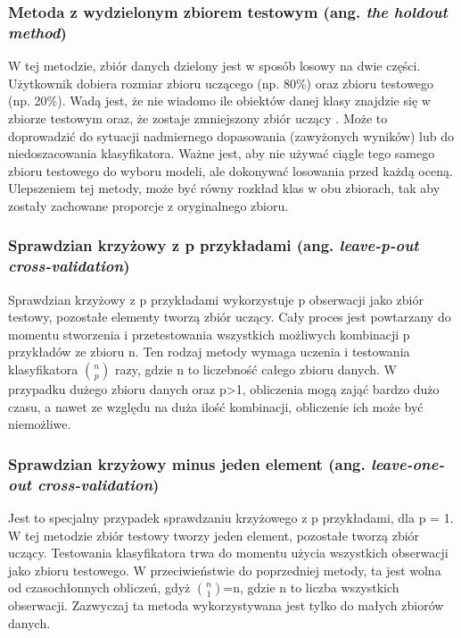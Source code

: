 \subsubsection{Metoda z wydzielonym zbiorem testowym (ang. \textit{the holdout method})}
W tej metodzie, zbiór danych dzielony jest w sposób losowy na dwie części. Użytkownik dobiera rozmiar zbioru uczącego (np. 80\%) oraz zbioru testowego (np. 20\%). Wadą jest, że nie wiadomo ile obiektów danej klasy znajdzie się w zbiorze testowym oraz, że zostaje zmniejszony zbiór uczący . Może to doprowadzić do sytuacji nadmiernego dopasowania (zawyżonych wyników) lub do niedoszacowania klasyfikatora. Ważne jest, aby nie używać ciągle tego samego zbioru testowego do wyboru modeli, ale dokonywać losowania przed każdą oceną.\\
Ulepszeniem tej metody, może być równy rozkład klas w obu zbiorach, tak aby zostały zachowane proporcje z oryginalnego zbioru.
\subsubsection{Sprawdzian krzyżowy z p przykładami (ang. \textit{leave-p-out cross-validation})}
Sprawdzian krzyżowy z p przykładami wykorzystuje p obserwacji jako zbiór testowy, pozostałe elementy tworzą zbiór uczący. Cały proces jest powtarzany do momentu stworzenia i przetestowania wszystkich możliwych kombinacji p przykładów ze zbioru n. Ten rodzaj metody wymaga uczenia i testowania klasyfikatora $\binom{n}{p}$ razy, gdzie n to liczebność całego zbioru danych. W przypadku dużego zbioru danych oraz p>1, obliczenia mogą zająć bardzo dużo czasu, a nawet ze względu na duża ilość kombinacji, obliczenie ich może być niemożliwe.
\subsubsection{Sprawdzian krzyżowy minus jeden element (ang. \textit{leave-one-out cross-validation})}
Jest to specjalny przypadek sprawdzaniu krzyżowego z p przykładami, dla p = 1. W tej metodzie zbiór testowy tworzy jeden element, pozostałe tworzą zbiór uczący. Testowania klasyfikatora trwa do momentu użycia wszystkich obserwacji jako zbioru testowego. W przeciwieństwie do poprzedniej metody, ta jest wolna od czasochłonnych obliczeń, gdyż $\binom{n}{1}$=n, gdzie n to liczba wszystkich obserwacji. Zazwyczaj ta metoda wykorzystywana jest tylko do małych zbiorów danych.



